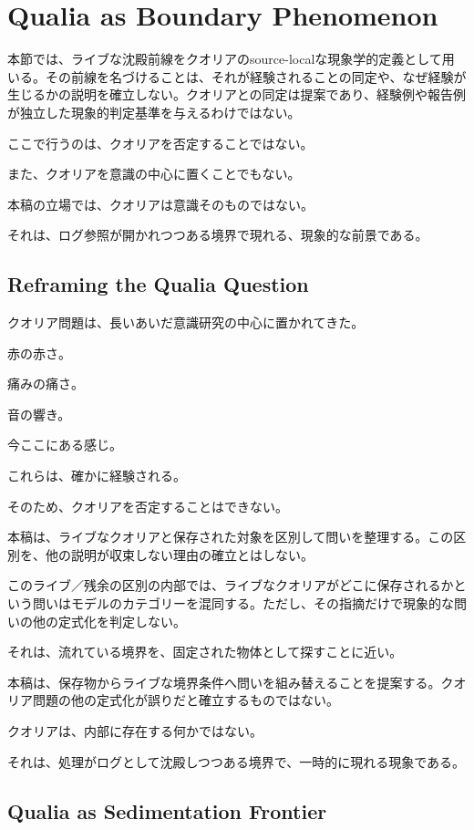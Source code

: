\section{Qualia as Boundary Phenomenon}


本節では、ライブな沈殿前線をクオリアのsource-localな現象学的定義として用いる。その前線を名づけることは、それが経験されることの同定や、なぜ経験が生じるかの説明を確立しない。クオリアとの同定は提案であり、経験例や報告例が独立した現象的判定基準を与えるわけではない。

ここで行うのは、クオリアを否定することではない。

また、クオリアを意識の中心に置くことでもない。

本稿の立場では、クオリアは意識そのものではない。

それは、ログ参照が開かれつつある境界で現れる、現象的な前景である。

\subsection{Reframing the Qualia Question}

クオリア問題は、長いあいだ意識研究の中心に置かれてきた。

赤の赤さ。

痛みの痛さ。

音の響き。

今ここにある感じ。

これらは、確かに経験される。

そのため、クオリアを否定することはできない。

本稿は、ライブなクオリアと保存された対象を区別して問いを整理する。この区別を、他の説明が収束しない理由の確立とはしない。

このライブ／残余の区別の内部では、ライブなクオリアがどこに保存されるかという問いはモデルのカテゴリーを混同する。ただし、その指摘だけで現象的な問いの他の定式化を判定しない。

それは、流れている境界を、固定された物体として探すことに近い。

本稿は、保存物からライブな境界条件へ問いを組み替えることを提案する。クオリア問題の他の定式化が誤りだと確立するものではない。

クオリアは、内部に存在する何かではない。

それは、処理がログとして沈殿しつつある境界で、一時的に現れる現象である。

\subsection{Qualia as Sedimentation Frontier}

